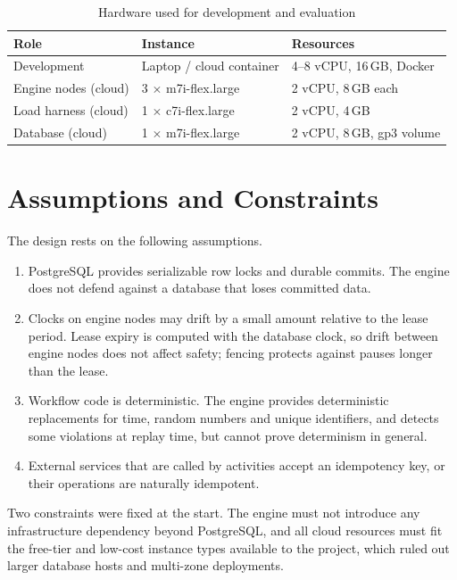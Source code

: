 \begin{table}[htbp]
  \centering
  \caption{Hardware used for development and evaluation}
  \label{tab:hw}
  \small
  \begin{tabular}{|p{1.23in}|p{1.65in}|p{2.31in}|}
    \hline
    \textbf{Role} & \textbf{Instance} & \textbf{Resources} \\
    \hline
    Development & Laptop / cloud container & 4--8 vCPU, 16\,GB, Docker \\
    \hline
    Engine nodes (cloud) & 3 $\times$ m7i-flex.large & 2 vCPU, 8\,GB each \\
    \hline
    Load harness (cloud) & 1 $\times$ c7i-flex.large & 2 vCPU, 4\,GB \\
    \hline
    Database (cloud) & 1 $\times$ m7i-flex.large & 2 vCPU, 8\,GB, gp3 volume \\
    \hline
  \end{tabular}
\end{table}

\section{Assumptions and Constraints}

The design rests on the following assumptions.

\begin{enumerate}[leftmargin=*, itemsep=2pt]
  \item PostgreSQL provides serializable row locks and durable commits. The
    engine does not defend against a database that loses committed data.
  \item Clocks on engine nodes may drift by a small amount relative to the
    lease period. Lease expiry is computed with the database clock, so drift
    between engine nodes does not affect safety; fencing protects against
    pauses longer than the lease.
  \item Workflow code is deterministic. The engine provides deterministic
    replacements for time, random numbers and unique identifiers, and detects
    some violations at replay time, but cannot prove determinism in general.
  \item External services that are called by activities accept an
    idempotency key, or their operations are naturally idempotent.
\end{enumerate}

Two constraints were fixed at the start. The engine must not introduce any
infrastructure dependency beyond PostgreSQL, and all cloud resources must fit
the free-tier and low-cost instance types available to the project, which
ruled out larger database hosts and multi-zone deployments.

